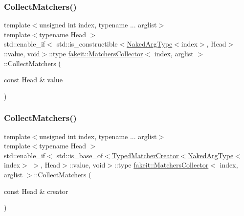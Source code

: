\mbox{\label{classfakeit_1_1MatchersCollector_affd243a89f758239d77c70dce6318087}} 
\subsubsection{\texorpdfstring{CollectMatchers()}{CollectMatchers()}\hspace{0.1cm}{\footnotesize\ttfamily [19/63]}}
{\footnotesize\ttfamily template$<$unsigned int index, typename ... arglist$>$ \\
template$<$typename Head $>$ \\
std\+::enable\+\_\+if$<$ std\+::is\+\_\+constructible$<$\mbox{\hyperlink{classfakeit_1_1MatchersCollector_aeda8ced6a2f0cb7c6e4f916f18a91730}{Naked\+Arg\+Type}}$<$index$>$, Head$>$\+::value, void$>$\+::type \mbox{\hyperlink{classfakeit_1_1MatchersCollector}{fakeit\+::\+Matchers\+Collector}}$<$ index, arglist $>$\+::Collect\+Matchers (\begin{DoxyParamCaption}\item[{const Head \&}]{value }\end{DoxyParamCaption})\hspace{0.3cm}{\ttfamily [inline]}}

\mbox{\label{classfakeit_1_1MatchersCollector_ae954aa74286bcd096169067f5e897356}} 
\subsubsection{\texorpdfstring{CollectMatchers()}{CollectMatchers()}\hspace{0.1cm}{\footnotesize\ttfamily [20/63]}}
{\footnotesize\ttfamily template$<$unsigned int index, typename ... arglist$>$ \\
template$<$typename Head $>$ \\
std\+::enable\+\_\+if$<$ std\+::is\+\_\+base\+\_\+of$<$\mbox{\hyperlink{structfakeit_1_1TypedMatcherCreator}{Typed\+Matcher\+Creator}}$<$\mbox{\hyperlink{classfakeit_1_1MatchersCollector_aeda8ced6a2f0cb7c6e4f916f18a91730}{Naked\+Arg\+Type}}$<$index$>$ $>$, Head$>$\+::value, void$>$\+::type \mbox{\hyperlink{classfakeit_1_1MatchersCollector}{fakeit\+::\+Matchers\+Collector}}$<$ index, arglist $>$\+::Collect\+Matchers (\begin{DoxyParamCaption}\item[{const Head \&}]{creator }\end{DoxyParamCaption})\hspace{0.3cm}{\ttfamily [inline]}}

